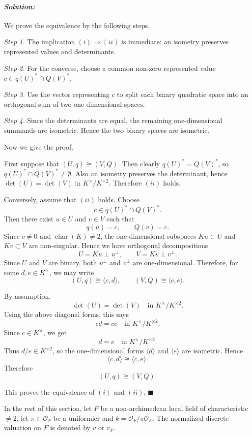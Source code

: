 \documentclass[12pt, a4paper]{article}
\newenvironment{solution}
  {\paragraph{\textit{Solution:}}\par\medskip}
  {\hfill$\blacksquare$\vspace{0.1cm}}
\begin{document}
\begin{solution}
We prove the equivalence by the following steps.

\emph{Step 1.} The implication \((i)\Rightarrow (ii)\) is immediate: an
isometry preserves represented values and determinants.

\emph{Step 2.} For the converse, choose a common non-zero represented value
\(c\in q(U)^*\cap Q(V)^*\).

\emph{Step 3.} Use the vector representing \(c\) to split each binary quadratic
space into an orthogonal sum of two one-dimensional spaces.

\emph{Step 4.} Since the determinants are equal, the remaining one-dimensional
summands are isometric. Hence the two binary spaces are isometric.

Now we give the proof.

First suppose that \((U,q)\cong (V,Q)\). Then clearly \(q(U)^*=Q(V)^*\), so
\(q(U)^*\cap Q(V)^*\neq \emptyset\). Also an isometry preserves the determinant,
hence \(\det(U)=\det(V)\) in \(K^\times/K^{\times 2}\). Therefore \((ii)\)
holds.

Conversely, assume that \((ii)\) holds. Choose
\[
c\in q(U)^*\cap Q(V)^*.
\]
Then there exist \(u\in U\) and \(v\in V\) such that
\[
q(u)=c,\qquad Q(v)=c.
\]
Since \(c\neq 0\) and \(\operatorname{char}(K)\neq 2\), the one-dimensional
subspaces \(Ku\subset U\) and \(Kv\subset V\) are non-singular. Hence we have
orthogonal decompositions
\[
U=Ku\perp u^\perp,\qquad V=Kv\perp v^\perp .
\]
Since \(U\) and \(V\) are binary, both \(u^\perp\) and \(v^\perp\) are
one-dimensional. Therefore, for some \(d,e\in K^\times\), we may write
\[
(U,q)\cong \langle c,d\rangle,\qquad (V,Q)\cong \langle c,e\rangle .
\]

By assumption,
\[
\det(U)=\det(V)\quad \text{in } K^\times/K^{\times 2}.
\]
Using the above diagonal forms, this says
\[
cd=ce \quad \text{in } K^\times/K^{\times 2}.
\]
Since \(c\in K^\times\), we get
\[
d=e \quad \text{in } K^\times/K^{\times 2}.
\]
Thus \(d/e\in K^{\times 2}\), so the one-dimensional forms
\(\langle d\rangle\) and \(\langle e\rangle\) are isometric. Hence
\[
\langle c,d\rangle\cong \langle c,e\rangle.
\]
Therefore
\[
(U,q)\cong (V,Q).
\]

This proves the equivalence of \((i)\) and \((ii)\).
\end{solution}

\noindent In the rest of this section, let $F$ be a non-archimedean local field of characteristic $\neq 2$, let $\pi \in \mathcal{O}_F$ be a uniformier and $k = \mathcal{O}_F / \pi \mathcal{O}_F$. The normalized discrete valuation on $F$ is denoted by $v$ or $v_F$.
\end{document}
